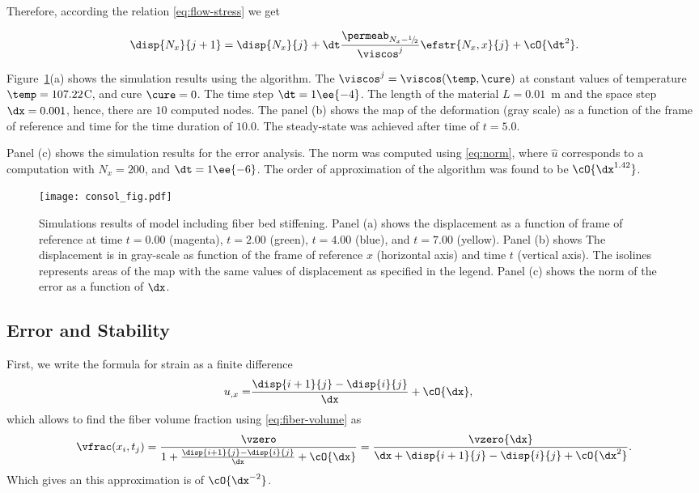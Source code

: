 \documentclass[twoside,a4paper,12pt]{article}
\newcommand{\figref}[1]{Figure~\ref{#1}}
\newcommand*\rfrac[2]{{}^{#1}\!/\!_{#2}}
\begin{document}
Therefore, according the relation \eqref{eq:flow-stress}
we get
%

\begin{align}
 \disp{N_x}{j+1} = \disp{N_x}{j} + \dt \frac{\permeab_{N_x-\rfrac{1}{2}}}{\viscos^j}\efstr{N_x,x}{j} + \cO{\dt^2}. \label{eq:algorithm-spatial-top-boundary}
\end{align}

\figref{fig:consol}(a) shows the simulation results using the
algorithm. The $\viscos^j = \viscos(\temp,\cure)$ at constant values
of temperature $\temp=107.22$\degree C, and cure $\cure = 0$. The time
step $\dt=1\ee{-4}$. The length of the material $L=0.01$~m and the
space step $\dx=0.001$, hence, there are $10$ computed nodes. The
panel (b) shows the map of the deformation (gray scale) as a function
of the frame of reference and time for the time duration of
$10.0$. The steady-state was achieved after time of $t=5.0$.

Panel (c) shows the simulation results for the error
analysis. The norm was computed using \eqref{eq:norm}, where $\hat{u}$
corresponds to a computation with $N_x=200$, and $\dt=1\ee{-6}$. The
order of approximation of the algorithm was found to be
$\cO{\dx^{1.42}}$.

\begin{figure}
  \centering
  \texttt{[image: consol\_fig.pdf]}
  \caption[Simulations results of model including fiber bed
  stiffening.]{Simulations results of model including fiber bed
    stiffening. Panel (a) shows the displacement as a function of
    frame of reference at time $t=0.00$ (magenta), $t=2.00$ (green),
    $t=4.00$ (blue), and $t=7.00$ (yellow). Panel (b) shows The
    displacement is in gray-scale as function of the frame of
    reference $x$ (horizontal axis) and time $t$ (vertical axis). The
    isolines represents areas of the map with the same values of
    displacement as specified in the legend. Panel (c) shows the norm
    of the error as a function of $\dx$.}
  \label{fig:consol}
\end{figure}



\subsection{Error and Stability}

First, we write the formula for strain as a finite
difference
%
\begin{align}
  u_{,x} =& \frac{\disp{i+1}{j} - \disp{i}{j}}{\dx} + \cO{\dx},
\end{align}
%
which allows to find the fiber volume fraction using
\eqref{eq:fiber-volume} as
%
\begin{align}
  \vfrac(x_i,t_j) = \frac{\vzero}{1+\frac{\disp{i+1}{j} - \disp{i}{j}}{\dx} + \cO{\dx}}
  = \frac{\vzero{\dx}}{{\dx + \disp{i+1}{j} - \disp{i}{j} + \cO{\dx^2}}}
  \label{eq:vfrac-findiff}.
\end{align}
%
Which gives an this approximation is of $\cO{\dx^{-2}}$.
\end{document}
